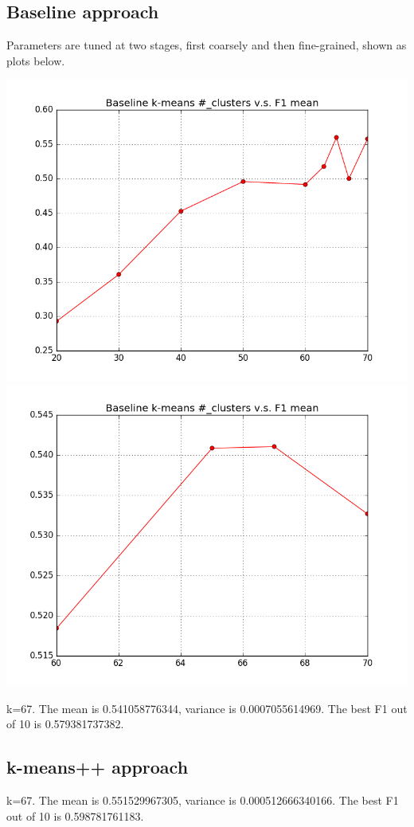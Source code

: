 \documentclass{article}
\begin{document}
\subsection{Baseline approach}
Parameters are tuned at two stages, first coarsely and then fine-grained, shown as plots below. \\
\begin{center}
\includegraphics[scale=0.3]{Coarsefrom20to80.png}
\includegraphics[scale=0.3]{finefrom60to70.png}
\end{center}

k=67. The mean is 0.541058776344, variance is 0.0007055614969. The best F1 out of 10 is 0.579381737382.\\
\subsection{k-means++ approach}
k=67. The mean is 0.551529967305, variance is 0.000512666340166. The best F1 out of 10 is 0.598781761183. \\
\end{document}
